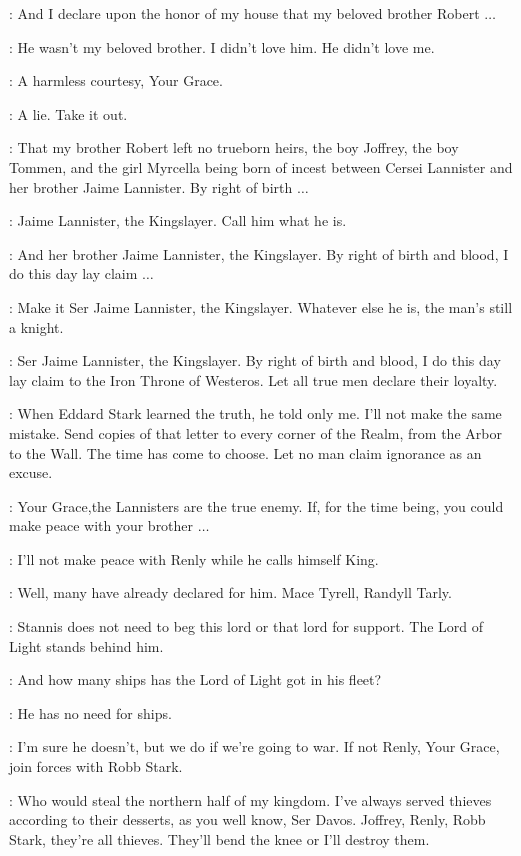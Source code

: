 \MATTHOS: And I declare upon the honor of my house that my beloved brother Robert $\ldots$

\STANNIS: He wasn't my beloved brother. I didn't love him. He didn't love me.

\DAVOS: A harmless courtesy, Your Grace.

\STANNIS: A lie. Take it out.

\MATTHOS: That my brother Robert left no trueborn heirs, the boy Joffrey, the boy Tommen, and the girl Myrcella being born of incest between Cersei Lannister and her brother Jaime Lannister. By right of birth $\ldots$

\STANNIS: Jaime Lannister, the Kingslayer. Call him what he is.

\MATTHOS: And her brother Jaime Lannister, the Kingslayer. By right of birth and blood, I do this day lay claim $\ldots$

\STANNIS: Make it Ser Jaime Lannister, the Kingslayer. Whatever else he is, the man's still a knight.

\MATTHOS: Ser Jaime Lannister, the Kingslayer. By right of birth and blood, I do this day lay claim to the Iron Throne of Westeros. Let all true men declare their loyalty.

\STANNIS: When Eddard Stark learned the truth, he told only me. I'll not make the same mistake. Send copies of that letter to every corner of the Realm, from the Arbor to the Wall. The time has come to choose. Let no man claim ignorance as an excuse.

\DAVOS: Your Grace,the Lannisters are the true enemy. If, for the time being, you could make peace with your brother $\ldots$

\STANNIS: I'll not make peace with Renly while he calls himself King.

\DAVOS: Well, many have already declared for him. Mace Tyrell, Randyll Tarly.

\MELISANDRE: Stannis does not need to beg this lord or that lord for support. The Lord of Light stands behind him.

\DAVOS: And how many ships has the Lord of Light got in his fleet?

\MELISANDRE: He has no need for ships.

\DAVOS: I'm sure he doesn't, but we do if we're going to war. If not Renly, Your Grace, join forces with Robb Stark.

\STANNIS: Who would steal the northern half of my kingdom. I've always served thieves according to their desserts, as you well know, Ser Davos. Joffrey, Renly, Robb Stark, they're all thieves. They'll bend the knee or I'll destroy them.

